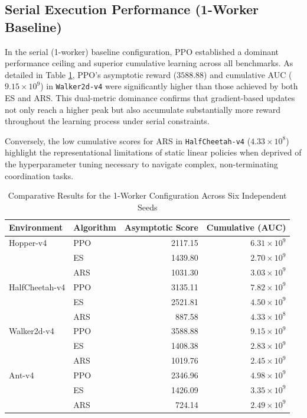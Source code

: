 \subsection{Serial Execution Performance (1-Worker Baseline)}
In the serial (1-worker) baseline configuration, PPO established a dominant performance ceiling and superior cumulative learning across all benchmarks. As detailed in Table \ref{tab:1w_asymptotic}, PPO's asymptotic reward ($3588.88$) and cumulative AUC ($9.15 \times 10^9$) in \texttt{Walker2d-v4} were significantly higher than those achieved by both ES and ARS. This dual-metric dominance confirms that gradient-based updates not only reach a higher peak but also accumulate substantially more reward throughout the learning process under serial constraints.

Conversely, the low cumulative scores for ARS in \texttt{HalfCheetah-v4} ($4.33 \times 10^8$) highlight the representational limitations of static linear policies when deprived of the hyperparameter tuning necessary to navigate complex, non-terminating coordination tasks.

\begin{table}[h!]
\centering
\caption{Comparative Results for the 1-Worker Configuration Across Six Independent Seeds}
\label{tab:1w_asymptotic}
\begin{tabular}{@{}llrr@{}}
\toprule
\textbf{Environment} & \textbf{Algorithm} & \textbf{Asymptotic Score} & \textbf{Cumulative (AUC)} \\ \midrule
Hopper-v4 & PPO & 2117.15 & $6.31 \times 10^9$ \\
 & ES & 1439.80 & $2.70 \times 10^9$ \\
 & ARS & 1031.30 & $3.03 \times 10^9$ \\ \addlinespace
HalfCheetah-v4 & PPO & 3135.11 & $7.82 \times 10^9$ \\
 & ES & 2521.81 & $4.50 \times 10^9$ \\
 & ARS & 887.58 & $4.33 \times 10^8$ \\ \addlinespace
Walker2d-v4 & PPO & 3588.88 & $9.15 \times 10^9$ \\
 & ES & 1408.38 & $2.83 \times 10^9$ \\
 & ARS & 1019.76 & $2.45 \times 10^9$ \\ \addlinespace
Ant-v4 & PPO & 2346.96 & $4.98 \times 10^9$ \\
 & ES & 1426.09 & $3.35 \times 10^9$ \\
 & ARS & 724.14 & $2.49 \times 10^9$ \\ \bottomrule
\end{tabular}
\end{table}

